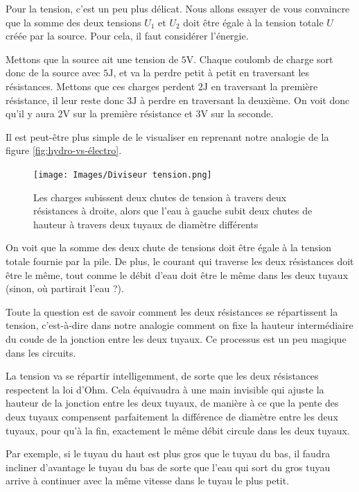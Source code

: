 \documentclass{article}
\begin{document}
Pour la tension, c'est un peu plus délicat. Nous allons essayer de vous convaincre que la somme des deux tensions $U_1$ et $U_2$ doit être égale à la tension totale $U$ créée par la source. Pour cela, il faut considérer l'énergie.

Mettons que la source ait une tension de $5\si{\volt}$. Chaque coulomb de charge sort donc de la source avec $5\si{\joule}$, et va la perdre petit à petit en traversant les résistances. Mettons que ces charges perdent $2\si{\joule}$ en traversant la première résistance, il leur reste donc $3\si{\joule}$ à perdre en traversant la deuxième. On voit donc qu'il y aura $2\si{\volt}$ sur la première résistance et $3\si{\volt}$ sur la seconde.

Il est peut-être plus simple de le visualiser en reprenant notre analogie de la figure \ref{fig:hydro-vs-électro}.

\begin{figure}[h]
    \centering
    \texttt{[image: Images/Diviseur tension.png]}
    \caption{Les charges subissent deux chutes de tension à travers deux résistances à droite, alors que l'eau à gauche subit deux chutes de hauteur à travers deux tuyaux de diamètre différents}
\end{figure}

On voit que la somme des deux chute de tensions doit être égale à la tension totale fournie par la pile. De plus, le courant qui traverse les deux résistances doit être le même, tout comme le débit d'eau doit être le même dans les deux tuyaux (sinon, où partirait l'eau ?). 

Toute la question est de savoir comment les deux résistances se répartissent la tension, c'est-à-dire dans notre analogie comment on fixe la hauteur intermédiaire du coude de la jonction entre les deux tuyaux. Ce processus est un peu magique dans les circuits.

La tension va se répartir intelligemment, de sorte que les deux résistances respectent la loi d'Ohm. Cela équivaudra à une main invisible qui ajuste la hauteur de la jonction entre les deux tuyaux, de manière à ce que la pente des deux tuyaux compensent parfaitement la différence de diamètre entre les deux tuyaux, pour qu'à la fin, exactement le même débit circule dans les deux tuyaux.

Par exemple, si le tuyau du haut est plus gros que le tuyau du bas, il faudra incliner d'avantage le tuyau du bas de sorte que l'eau qui sort du gros tuyau arrive à continuer avec la même vitesse dans le tuyau le plus petit.
\end{document}
